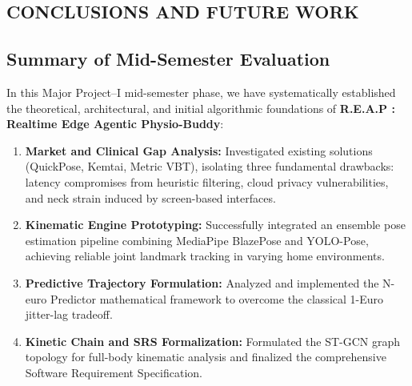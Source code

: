 \documentclass[12pt,a4paper]{report}
\begin{document}
\begin{center}
    \justifying
    \chapter{CONCLUSIONS AND FUTURE WORK}
\end{center}

\section{Summary of Mid-Semester Evaluation}
In this Major Project--I mid-semester phase, we have systematically established the theoretical, architectural, and initial algorithmic foundations of \textbf{R.E.A.P : Realtime Edge Agentic Physio-Buddy}:
\begin{enumerate}[label=\textbf{(\arabic*)}]
    \item \textbf{Market and Clinical Gap Analysis:} Investigated existing solutions (QuickPose, Kemtai, Metric VBT), isolating three fundamental drawbacks: latency compromises from heuristic filtering, cloud privacy vulnerabilities, and neck strain induced by screen-based interfaces.
    \item \textbf{Kinematic Engine Prototyping:} Successfully integrated an ensemble pose estimation pipeline combining MediaPipe BlazePose and YOLO-Pose, achieving reliable joint landmark tracking in varying home environments.
    \item \textbf{Predictive Trajectory Formulation:} Analyzed and implemented the N-euro Predictor mathematical framework to overcome the classical 1-Euro jitter-lag tradeoff.
    \item \textbf{Kinetic Chain and SRS Formalization:} Formulated the ST-GCN graph topology for full-body kinematic analysis and finalized the comprehensive Software Requirement Specification.
\end{enumerate}
\end{document}
